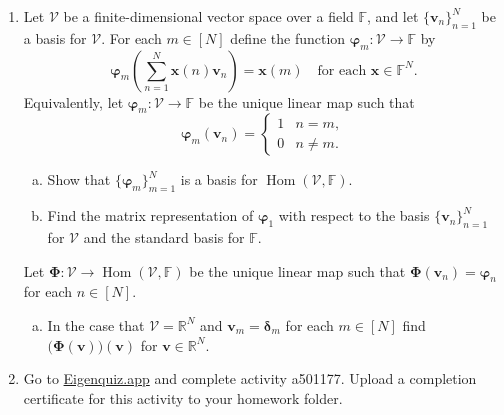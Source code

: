 \documentclass[12pt]{amsart}
\newcommand{\1}{\mathbbm{1}}
\numberwithin{equation}{section}
\numberwithin{Theorem}{section}
\theoremstyle{plain} %
\theoremstyle{definition}
\theoremstyle{remark}
\begin{document}
\begin{enumerate}[1.]
\bigskip

\item Let \(\mathcal{V}\) be a finite-dimensional vector space over a field \(\mathbb{F}\), and let \(\{\mathbf{v}_{n}\}_{n=1}^{N}\) be a basis for \(\mathcal{V}\). For each \(m\in[N]\) define the function \(\boldsymbol{\varphi}_{m}:\mathcal{V}\to\mathbb{F}\) by
\[\boldsymbol{\varphi}_{m}\left(\sum_{n=1}^{N}\mathbf{x}(n)\mathbf{v}_{n}\right) = \mathbf{x}(m)\quad\text{for each }\mathbf{x}\in\mathbb{F}^{N}.\]
Equivalently, let \(\boldsymbol{\varphi}_{m}:\mathcal{V}\to\mathbb{F}\) be the unique linear map such that
\[\boldsymbol{\varphi}_{m}(\mathbf{v}_{n}) = \begin{cases} 1 & n=m,\\ 0 & n\neq m.\end{cases}\]

\begin{enumerate}[(a)]

\item Show that \(\{\boldsymbol{\varphi}_{m}\}_{m=1}^{N}\) is a basis for \(\operatorname{Hom}(\mathcal{V},\mathbb{F})\).\medskip

\item Find the matrix representation of \(\boldsymbol{\varphi}_{1}\) with respect to the basis \(\{\mathbf{v}_{n}\}_{n=1}^{N}\) for \(\mathcal{V}\) and the standard basis for \(\mathbb{F}\).\medskip

\end{enumerate}

\noindent Let \(\mathbf{\Phi}:\mathcal{V}\to\operatorname{Hom}(\mathcal{V},\mathbb{F})\) be the unique linear map such that \(\mathbf{\Phi}(\mathbf{v}_{n}) = \boldsymbol{\varphi}_{n}\) for each \(n\in[N]\).\medskip

\begin{enumerate}[(a)]

\addtocounter{enumii}{2}

\item In the case that \(\mathcal{V}=\mathbb{R}^{N}\) and \(\mathbf{v}_{m}=\boldsymbol{\delta}_{m}\) for each \(m\in[N]\) find \(\big(\mathbf{\Phi}(\mathbf{v})\big)(\mathbf{v})\) for \(\mathbf{v}\in\mathbb{R}^{N}\). \medskip

\bigskip

\end{enumerate}

\item Go to \href{https://eigenquiz.app/}{Eigenquiz.app} and complete activity a501177. Upload a completion certificate for this activity to your homework folder.

\end{enumerate}
\end{document}
